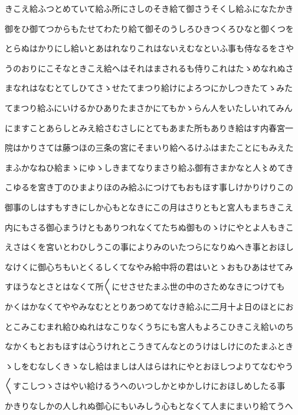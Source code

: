 \documentclass[a4paper,11pt,landscape]{ltjtarticle}
\begin{document}
きこえ給ふつとめていて給ふ所にさしのそき給て御さうそくし給ふになたかき
\par\medskip
御をひ御てつからもたせてわたり給て御そのうしろひきつくろひなと御くつを
\par\medskip
とらぬはかりにし給いとあはれなりこれはないえむなといふ事も侍なるをさや
\par\medskip
うのおりにこそなときこえ給へはそれはまされるも侍りこれはたゝめなれぬさ
\par\medskip
まなれはなむとてしひてさゝせたてまつり給けによろつにかしつきたてゝみた
\par\medskip
てまつり給ふにいけるかひありたまさかにてもかゝらん人をいたしいれてみん
\par\medskip
にますことあらしとみえ給さむさしにとてもあまた所もありき給はす内春宮一
\par\medskip
院はかりさては藤つほの三条の宮にそまいり給へるけふはまたことにもみえた
\par\medskip
まふかなねひ給まゝにゆゝしきまてなりまさり給ふ御有さまかなと人〻めてき
\par\medskip
こゆるを宮き丁のひまよりほのみ給ふにつけてもおもほす事しけかりけりこの
\par\medskip
御事のしはすもすきにしか心もとなきにこの月はさりともと宮人もまちきこえ
\par\medskip
内にもさる御心まうけともありつれなくてたちぬ御ものゝけにやとよ人もきこ
\par\medskip
えさはくを宮いとわひしうこの事によりみのいたつらになりぬへき事とおほし
\par\medskip
なけくに御心ちもいとくるしくてなやみ給中将の君はいとゝおもひあはせてみ
\par\medskip
すほうなとさとはなくて所〱にせさせたまふ世の中のさためなきにつけても
\par\medskip
かくはかなくてややみなむととりあつめてなけき給ふに二月十よ日のほとにお
\par\medskip
とこみこむまれ給ひぬれはなこりなくうちにも宮人もよろこひきこえ給いのち
\par\medskip
なかくもとおもほすは心うけれとこうきてんなとのうけはしけにのたまふとき
\par\medskip
ゝしをむなしくきゝなし給はましは人はらはれにやとおほしつよりてなむやう
\par\medskip
〱すこしつゝさはやい給けるうへのいつしかとゆかしけにおほしめしたる事
\par\medskip
かきりなしかの人しれぬ御心にもいみしう心もとなくて人まにまいり給てうへ
\par\medskip
\end{document}
